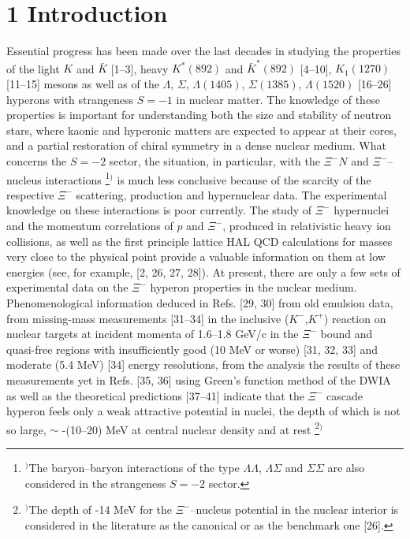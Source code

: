 \documentclass[12pt]{article}
\begin{document}
\newpage

\section*{1 Introduction}

\hspace{0.5cm} Essential progress has been made over the last decades in studying the properties
of the light $K$ and ${\bar K}$ [1--3], heavy $K^*(892)$ and ${\bar K}^*(892)$ [4--10], $K_1(1270)$ [11--15]
mesons as well as of the $\Lambda$, $\Sigma$, $\Lambda(1405)$, $\Sigma(1385)$, $\Lambda(1520)$
[16--26] hyperons with strangeness $S=-1$ in nuclear matter. The knowledge of these properties is important
for understanding both the size and stability of neutron stars, where kaonic and hyperonic matters are
expected to appear at their cores, and a partial restoration of chiral symmetry in a dense nuclear medium.
What concerns the $S=-2$ sector, the situation, in particular, with the ${\Xi^-}N$ and ${\Xi^-}$--nucleus interactions
\footnote{$^)$The baryon--baryon interactions of the type ${\Lambda}{\Lambda}$, ${\Lambda}{\Sigma}$ and
${\Sigma}{\Sigma}$ are also considered in the strangeness $S=-2$ sector.}$^)$
is much less conclusive because of the scarcity of the respective $\Xi^-$ scattering, production and hypernuclear data. The experimental knowledge on these interactions is poor currently.
The study of $\Xi^-$ hypernuclei and the momentum correlations of $p$ and $\Xi^-$, produced in relativistic
heavy ion collisions, as well as the first principle lattice HAL QCD calculations for masses very close to
the physical point provide a valuable information on them at low energies (see, for example, [2, 26, 27, 28]).
At present, there are only a few sets of experimental data on the $\Xi^-$ hyperon properties in the nuclear medium.
Phenomenological information deduced in Refs. [29, 30] from old emulsion data, from missing-mass
measurements [31--34] in the inclusive ($K^-$,$K^+$) reaction on nuclear targets at incident momenta of
1.6--1.8 GeV/c in the $\Xi^-$ bound and quasi-free regions with insufficiently good (10 MeV or worse) [31, 32, 33]
and moderate (5.4 MeV) [34] energy resolutions, from the analysis the results of these measurements
yet in Refs. [35, 36] using Green's function method of the DWIA as well as the theoretical predictions [37--41]
indicate that the $\Xi^-$ cascade hyperon feels only a weak attractive potential in nuclei,
the depth of which is not so large, $\sim$ -(10--20) MeV at central nuclear density and at rest
\footnote{$^)$The depth of -14 MeV for the ${\Xi^-}$--nucleus potential in the nuclear interior is considered
in the literature as the canonical or as the benchmark one [26].}$^)$
\end{document}
